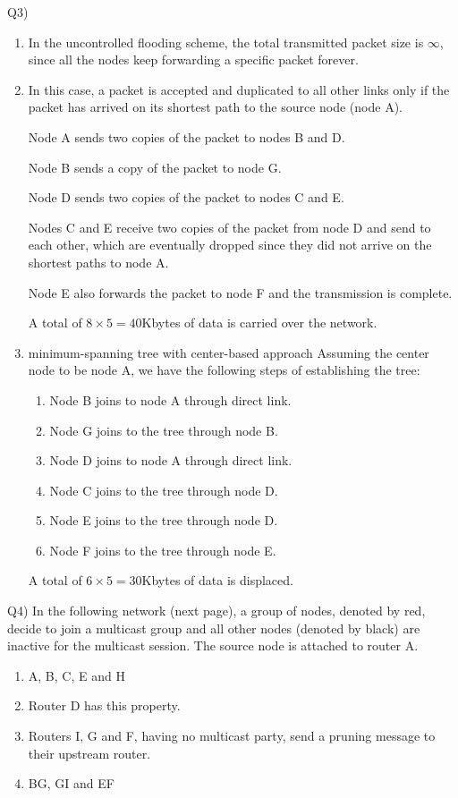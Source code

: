 \documentclass[10pt,letterpaper]{article}
\begin{document}
Q3) 
\begin{enumerate}[label=\alph*-]
\item
In the uncontrolled flooding scheme, the total transmitted packet size is $\infty$, since all the nodes keep forwarding a specific packet forever.
\item
In this case, a packet is accepted and duplicated to all other links only if the packet has arrived on its shortest path to the source node (node A).

Node A sends two copies of the packet to nodes B and D.

Node B sends a copy of the packet to node G.

Node D sends two copies of the packet to nodes C and E.

Nodes C and E receive two copies of the packet from node D and send to each other, which are eventually dropped since they did not arrive on the shortest paths to node A.

Node E also forwards the packet to node F and the transmission is complete.

A total of $8\times 5=40$Kbytes of data is carried over the network.
\item
minimum-spanning tree with center-based approach
Assuming the center node to be node A, we have the following steps of establishing the tree:
\begin{enumerate}
\item
Node B joins to node A through direct link.
\item
Node G joins to the tree through node B.
\item
Node D joins to node A through direct link.
\item
Node C joins to the tree through node D.
\item
Node E joins to the tree through node D.
\item
Node F joins to the tree through node E.
\end{enumerate}
A total of $6\times 5=30$Kbytes of data is displaced.
\end{enumerate}

Q4) In the following network (next page), a group of nodes, denoted by red, decide to join a multicast group and all other nodes (denoted by black) are inactive for the multicast session. The source node is attached to router A.
\begin{enumerate}[label=\alph*-]
\item
A, B, C, E and H
\item
Router D has this property.
\item
Routers I, G and F, having no multicast party, send a pruning message to their upstream router.
\item
BG, GI and EF
\end{enumerate}
\end{document}
